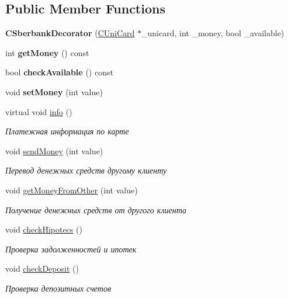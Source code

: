 \subsection*{Public Member Functions}
\begin{DoxyCompactItemize}
\item 
\mbox{\label{classCSberbankDecorator_a0cab61c44399947bbe5355a2fb70428f}} 
{\bfseries C\+Sberbank\+Decorator} (\hyperlink{classCUniCard}{C\+Uni\+Card} $\ast$\+\_\+unicard, int \+\_\+money, bool \+\_\+available)
\item 
\mbox{\label{classCSberbankDecorator_a253d67f88793c4e6ce5698e616cdeb07}} 
int {\bfseries get\+Money} () const
\item 
\mbox{\label{classCSberbankDecorator_ab69d38128eb4ba05d2d5b21769b80204}} 
bool {\bfseries check\+Available} () const
\item 
\mbox{\label{classCSberbankDecorator_a51576c6acd9000635528d0d414fcd053}} 
void {\bfseries set\+Money} (int value)
\item 
virtual void \hyperlink{classCSberbankDecorator_a2c19e1fe10123e813de29572512d69b8}{info} ()
\begin{DoxyCompactList}\small\item\em Платежная информация по карте \end{DoxyCompactList}\item 
void \hyperlink{classCSberbankDecorator_a6c8175379ec2e07e6b4fe6fe2da58425}{send\+Money} (int value)
\begin{DoxyCompactList}\small\item\em Перевод денежных средств другому клиенту \end{DoxyCompactList}\item 
void \hyperlink{classCSberbankDecorator_a4182d5c8d8d0214ad53c26ebe26cce09}{get\+Money\+From\+Other} (int value)
\begin{DoxyCompactList}\small\item\em Получение денежных средств от другого клиента \end{DoxyCompactList}\item 
void \hyperlink{classCSberbankDecorator_a60aedba1baefb930f51176b38d3682c5}{check\+Hipotecs} ()
\begin{DoxyCompactList}\small\item\em Проверка задолженностей и ипотек \end{DoxyCompactList}\item 
void \hyperlink{classCSberbankDecorator_a0bee1976bcb32c4e927166aa3ab857d0}{check\+Deposit} ()
\begin{DoxyCompactList}\small\item\em Проверка депозитных счетов \end{DoxyCompactList}\end{DoxyCompactItemize}


